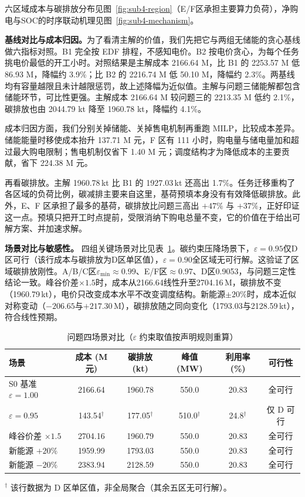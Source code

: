 六区域成本与碳排放分布见图~\ref{fig:sub4-region}（E/F区承担主要算力负荷），净购电与SOC的时序联动机理见图~\ref{fig:sub4-mechanism}。

\medskip\noindent\textbf{基线对比与成本归因。}为了看清主解的价值，我们先把它与两组无储能的贪心基线做六指标对照。B1 完全按 EDF 排程，不感知电价。B2 按电价贪心，为每个任务挑电价最低的开工小时。对照结果是主解成本 2166.64 M，比 B1 的 2253.57 M 低 86.93 M，降幅约 3.9\%；比 B2 的 2216.74 M 低 50.10 M，降幅约 2.3\%。两基线均有容量越限且未计越限惩罚，故上述降幅为近似值。主解与问题三储能解都包含储能环节，可比性更强。主解成本 2166.64 M 较问题三的 2213.35 M 低约 2.1\%，碳排放也由 2044.79 kt 降至 1960.78 kt，降幅约 4.1\%。

成本归因方面，我们分别关掉储能、关掉售电机制再重跑 MILP，比较成本差异。储能能量时移使成本抬升 137.71 M 元，F 区有 111 小时，购电量与储电量加和超过最大购电限制；售电机制仅省下 1.40 M 元；调度结构才为降低成本的主要贡献，省下 224.38 M 元。

再看碳排放。主解 1960.78\,kt 比 B1 的 1927.03\,kt 还高出 1.7\%。任务迁移重构了各区域的负荷比例，碳减排主要来自这里，基荷预填本身没有有效降低碳排放。此外，E、F 区承担了最多的基荷，碳排放比问题三高出 $+47\%$ 与 $+37\%$，正好印证这一点。预填只把开工时点提前，受限消纳下购电总量不变，它的价值在于给出可解方案、并加速求解。

\medskip\noindent\textbf{场景对比与敏感性。}
四组关键场景对比见表~\ref{tab:sub4-scenario}。碳约束压降场景下，$\varepsilon=0.95$仅D区可行（该行成本与碳排放为D区单区值），$\varepsilon=0.90$全区域无可行解。这验证了区域碳排放刚性。A/B/C区$\varepsilon_{\min}\approx0.99$、E/F区$\approx0.97$、D区0.9053，与问题三定性结论一致。峰谷价差$\times1.5$时，成本从2166.64线性升至2704.16\,M，碳排放不变（1960.79\,kt），电价只改变成本水平不改变调度结构。新能源$\pm20\%$时，成本近似对称变动（$-206.65$与$+217.30$\,M），碳排放随之同向变化（1793.03与2128.59\,kt），符合线性预期。

\begin{table}[H]
\centering
\footnotesize
\caption{问题四场景对比（$\varepsilon$ 约束取值按声明规则重算）}
\label{tab:sub4-scenario}
\begin{tabular}{lccccc}
\toprule
场景 & 成本 (M元) & 碳排放 (kt) & 峰值 (MW) & 利用率 (\%) & 可行性 \\
\midrule
S0 基准 $\varepsilon{=}1.00$ & 2166.64 & 1960.78 & 550.0 & 20.83 & 全可行 \\
$\varepsilon{=}0.95$ & 143.54$^{\dagger}$ & 177.05$^{\dagger}$ & 510.0$^{\dagger}$ & 24.8$^{\dagger}$ & 仅 D 可行 \\
峰谷价差 $\times1.5$ & 2704.16 & 1960.79 & 550.0 & 20.83 & 全可行 \\
新能源 $+20\%$ & 1959.99 & 1793.03 & 550.0 & 20.83 & 全可行 \\
新能源 $-20\%$ & 2383.94 & 2128.59 & 550.0 & 20.83 & 全可行 \\
\bottomrule
\end{tabular}
\par\smallskip\footnotesize
$^{\dagger}$ 该行数据为 D 区单区值，非全局聚合（其余五区无可行解）。
\end{table}

